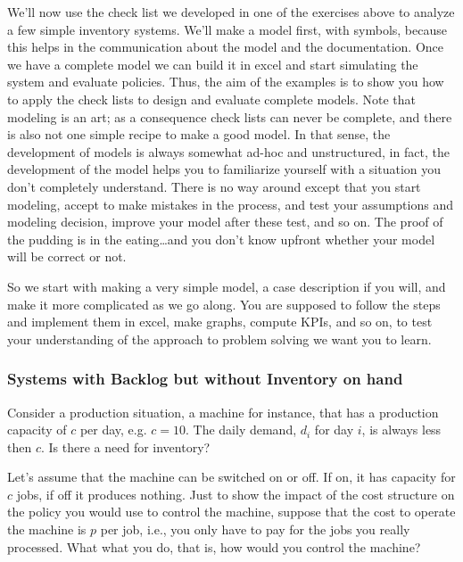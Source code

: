 We'll now use the check list we developed in one of the exercises
above to analyze a few simple inventory systems. We'll make a model
first, with symbols, because this helps in the communication about the
model and the documentation. Once we have a complete model we can
build it in excel and start simulating the system and evaluate
policies. Thus, the aim of the examples is to show you how to apply
the check lists to design and evaluate complete models. Note that
modeling is an art; as a consequence check lists can never be
complete, and there is also not one simple recipe to make a good
model. In that sense, the development of models is always somewhat
ad-hoc and unstructured, in fact, the development of the model helps
you to familiarize yourself with a situation you don't completely
understand. There is no way around except that you start modeling,
accept to make mistakes in the process, and test your assumptions and
modeling decision, improve your model after these test, and so on. The
proof of the pudding is in the eating\ldots and you don't know upfront
whether your model will be correct or not.

So we start with making a very simple model, a case description if you
will, and make it more complicated as we go along.  You are supposed
to follow the steps and implement them in excel, make graphs, compute
KPIs, and so on, to test your understanding of the approach to problem
solving we want you to learn.

\subsubsection{Systems with Backlog but without Inventory on hand}

\begin{exercise}
  Consider a production situation, a  machine for instance, that has a
  production capacity of  $c$ per day, e.g. $c=10$.  The daily demand,
  $d_i$ for day $i$, is always less then $c$. Is there a need for inventory?

\end{exercise}

\begin{exercise}
  Let's assume that the machine can be switched on or off.  If on, it
  has capacity for $c$ jobs, if off it produces nothing.  Just to show
  the impact of the cost structure on the policy you would use to
  control the machine, suppose that the cost to operate the machine is
  $p$ per job, i.e., you only have to pay for the jobs you really
  processed. What what you do, that is, how would you control the
  machine?

\end{exercise}

